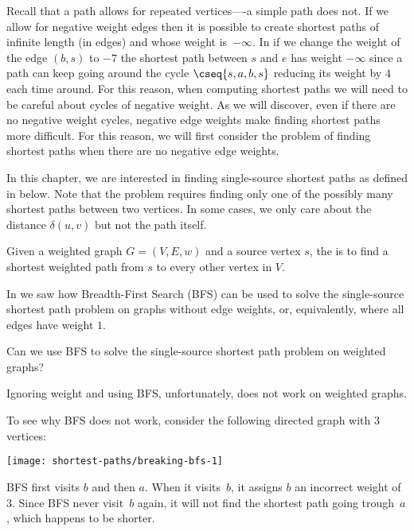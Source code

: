 Recall that a path allows for repeated vertices----a simple path does
not.
%
If we allow for negative weight edges then it is possible to create
shortest paths of infinite length (in edges) and whose weight
is~$-\infty$.  
%
In  if we change the weight of the
edge $(b,s)$ to $-7$ the shortest path between $s$ and $e$ has weight
$-\infty$ since a path can keep going around the cycle
$\cseq{s,a,b,s}$ reducing its weight by $4$ each time around.
%
For this reason, when computing shortest paths we will need to be
careful about cycles of negative weight.  
%
As we will discover, even if there are no negative weight cycles,
negative edge weights make finding shortest paths more difficult.
%
For this reason, we will first consider the problem of finding
shortest paths when there are no negative edge weights.  
%


In this chapter, we are interested in finding single-source shortest
paths as defined in  below.
%
Note that the problem requires finding  only one of the possibly many
shortest paths between two vertices.  
%
In some cases, we only care about the distance $\delta(u,v)$ but not
the path itself.

\begin{problem}
\label{prob:sp::sssp}
  Given a weighted graph $G = (V,E,w)$ and a source vertex $s$, the
   is to find a
  shortest weighted path from $s$ to every other vertex in $V$.
\end{problem}




In  we saw how Breadth-First Search (BFS) can be used to
solve the single-source shortest path problem on graphs without edge
weights, or, equivalently, where all edges have weight $1$.
\begin{question}
Can we use BFS to solve the single-source shortest path problem on
weighted graphs?
\end{question}
Ignoring weight and using BFS, unfortunately, does not work on
weighted graphs.

\begin{example}
To see why BFS does not work, consider the following
directed graph with $3$ vertices:
%
\begin{center}
  \texttt{[image: shortest-paths/breaking-bfs-1]}
\end{center}
%
BFS first visits $b$ and then $a$.  When it visits~$b$, it assigns $b$
an incorrect weight of~$3$. 
%
Since BFS never visit~$b$ again, it will not find the shortest path
going trough~$a$, which happens to be shorter.
\end{example}

